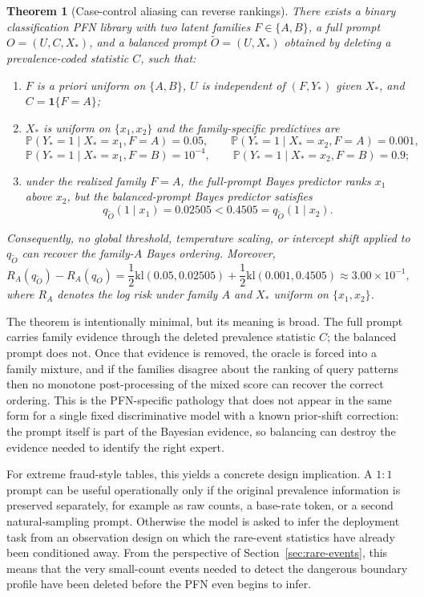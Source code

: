 \documentclass{article}
\newtheorem{theorem}{Theorem}
\theoremstyle{definition}
\theoremstyle{remark}
\newcommand{\Pbb}{\mathbb{P}}
\newcommand{\ind}{\mathbf{1}}
\newcommand{\klb}{\mathrm{kl}}
\begin{document}
\begin{theorem}[Case-control aliasing can reverse rankings]
\label{thm:balancing-counterexample}
There exists a binary classification PFN library with two latent families $F\in\{A,B\}$, a full prompt $O=(U,C,X_*)$, and a balanced prompt $\widetilde O=(U,X_*)$ obtained by deleting a prevalence-coded statistic $C$, such that:
\begin{enumerate}[leftmargin=18pt]
\item $F$ is a priori uniform on $\{A,B\}$, $U$ is independent of $(F,Y_*)$ given $X_*$, and $C=\ind\{F=A\}$;
\item $X_*$ is uniform on $\{x_1,x_2\}$ and the family-specific predictives are
\[
\Pbb(Y_*=1\mid X_*=x_1,F=A)=0.05,
\qquad
\Pbb(Y_*=1\mid X_*=x_2,F=A)=0.001,
\]
\[
\Pbb(Y_*=1\mid X_*=x_1,F=B)=10^{-4},
\qquad
\Pbb(Y_*=1\mid X_*=x_2,F=B)=0.9;
\]
\item under the realized family $F=A$, the full-prompt Bayes predictor ranks $x_1$ above $x_2$, but the balanced-prompt Bayes predictor satisfies
\[
q_{\widetilde O}(1\mid x_1)=0.02505
<
0.4505=q_{\widetilde O}(1\mid x_2).
\]
\end{enumerate}
Consequently, no global threshold, temperature scaling, or intercept shift applied to $q_{\widetilde O}$ can recover the family-$A$ Bayes ordering. Moreover,
\[
R_A(q_{\widetilde O})-R_A(q_O)
=
\frac{1}{2}\klb(0.05,0.02505)
+\frac{1}{2}\klb(0.001,0.4505)
\approx 3.00\times 10^{-1},
\]
where $R_A$ denotes the log risk under family $A$ and $X_*$ uniform on $\{x_1,x_2\}$.
\end{theorem}

The theorem is intentionally minimal, but its meaning is broad. The full prompt carries family evidence through the deleted prevalence statistic $C$; the balanced prompt does not. Once that evidence is removed, the oracle is forced into a family mixture, and if the families disagree about the ranking of query patterns then no monotone post-processing of the mixed score can recover the correct ordering. This is the PFN-specific pathology that does not appear in the same form for a single fixed discriminative model with a known prior-shift correction: the prompt itself is part of the Bayesian evidence, so balancing can destroy the evidence needed to identify the right expert.

For extreme fraud-style tables, this yields a concrete design implication. A $1{:}1$ prompt can be useful operationally only if the original prevalence information is preserved separately, for example as raw counts, a base-rate token, or a second natural-sampling prompt. Otherwise the model is asked to infer the deployment task from an observation design on which the rare-event statistics have already been conditioned away. From the perspective of Section~\ref{sec:rare-events}, this means that the very small-count events needed to detect the dangerous boundary profile have been deleted before the PFN even begins to infer.
\end{document}
